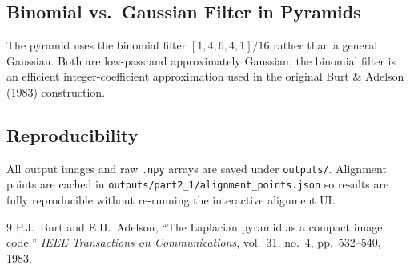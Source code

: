 \documentclass[12pt,a4paper]{article}
\begin{document}
\subsection{Binomial vs.\ Gaussian Filter in Pyramids}

The pyramid uses the binomial filter $[1,4,6,4,1]/16$ rather than a general
Gaussian.  Both are low-pass and approximately Gaussian; the binomial filter
is an efficient integer-coefficient approximation used in the original
Burt \& Adelson (1983) construction.

\subsection{Reproducibility}

All output images and raw \texttt{.npy} arrays are saved under
\texttt{outputs/}.  Alignment points are cached in
\texttt{outputs/part2\_1/alignment\_points.json} so results are fully
reproducible without re-running the interactive alignment UI.

\begin{thebibliography}{9}
  P.J.\ Burt and E.H.\ Adelson,
  ``The Laplacian pyramid as a compact image code,''
  \textit{IEEE Transactions on Communications},
  vol.~31, no.~4, pp.~532--540, 1983.
\end{thebibliography}
\end{document}
